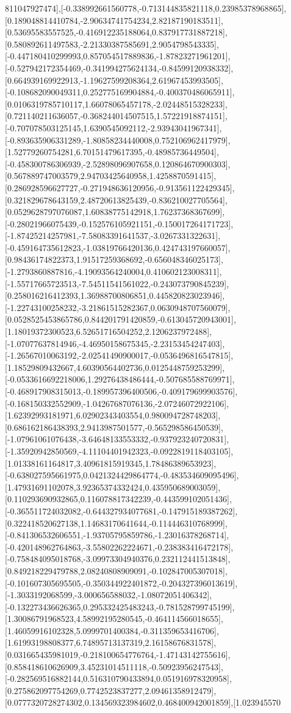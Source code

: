\documentclass{article}
\begin{document}
811047927474],[-0.338992661560778,-0.713144835821118,0.23985378968865],[0.189048814410784,-2.90634741754234,2.82187190183511],[0.53695583557525,-0.416912235188064,0.837917731887218],[0.580892611497583,-2.21330387585691,2.9054798543335],[-0.447180410299993,0.857054517889836,-1.87823271961201],[-0.527942172354469,-0.341994275624134,-0.84599120938332],[0.664939169922913,-1.19627599208364,2.61967453993505],[-0.108682090049311,0.252775169904884,-0.400370486065911],[0.0106319785710117,1.66078065457178,-2.02448515328233],[0.721140211636057,-0.368244014507515,1.57221918874151],[-0.707078503125145,1.6390545092112,-2.93943041967341],[-0.893635906331289,-1.80858234440008,0.752106962417979],[1.52779260754281,6.70151479617395,-0.48985736449504],[-0.458300786306939,-2.52898096907658,0.120864670900303],[0.567889747003579,2.94703425640958,1.4258870591415],[0.286928596627727,-0.271948636120956,-0.913561122429345],[0.321829678643159,2.48720613825439,-0.836210027705564],[0.0529628797076087,1.60838775142918,1.76237368367699],[-0.28021966075439,-0.152576105921151,-0.150017264171723],[-1.87425214257981,-7.58083391641537,-3.0267331322631],[-0.459164735612823,-1.03819766420136,0.424743197660057],[0.98436174822373,1.91517259368692,-0.656048346025173],[-1.2793860887816,-4.19093564240004,0.410602123008311],[-1.55717665723513,-7.54511541561022,-0.243073790845239],[0.258016216412393,1.36988700806851,0.445820823023946],[-1.22743100258232,-3.21861515282367,0.0630948707560079],[0.0528525453865786,0.844201791420859,-0.613045720943001],[1.18019372300523,6.52651716504252,2.1206237972488],[-1.07077637814946,-4.46950158675345,-2.23153454247403],[-1.26567010063192,-2.02541490900017,-0.0536496816547815],[1.18529809432667,4.60390564402736,0.0125448759253299],[-0.0533616692218006,1.29276438486444,-0.507685588769971],[-0.468917908315013,-0.189957396400506,-0.409179699903576],[-0.168150332552909,-1.04267687076136,-2.07246072922106],[1.62392993181971,6.02902343403554,0.980094728748203],[0.686162186438393,2.9413987501577,-0.565298586450539],[-1.07961061076438,-3.64648133553332,-0.937923240720831],[-1.35920942850569,-4.11104401942323,-0.0922819118403105],[1.01338161164817,3.40961815919345,1.78486389653923],[-0.638027595661975,0.0421324429864774,-0.483534609095496],[1.47931691102078,3.92365374332424,0.435950689003059],[0.110293690932865,0.116078817342239,-0.443599102051436],[-0.365511724032082,-0.644327934077681,-0.147915189387262],[0.322418520627138,1.14683170641644,-0.114446310768999],[-0.841306532606551,-1.93705795859786,-1.23016378268714],[-0.420148962764863,-3.55802262224671,-0.238383416472178],[-0.758484095018768,-3.09973304940376,0.232112441513848],[0.849218229479788,2.08240808909091,-0.102847005307018],[-0.101607305695505,-0.350344922401872,-0.204327396013619],[-1.3033192068599,-3.000656588032,-1.08072051406342],[-0.132273436626365,0.295332425483243,-0.781528799745199],[1.30086791968523,4.58992195280545,-0.464114566018655],[1.46059916102328,5.0999701400384,-0.311359653416706],[1.61993198808377,6.74895713137319,2.16158676831578],[0.031665435981019,-0.218100654776764,-1.47143142755616],[0.858418610626909,3.45231014511118,-0.50923956247543],[-0.282569516882144,0.516310790433894,0.051916978320958],[0.275862097754269,0.7742523837277,2.09461358912479],[0.0777320728274302,0.134569323984602,0.468400942001859],[1.023945570
\end{document}
